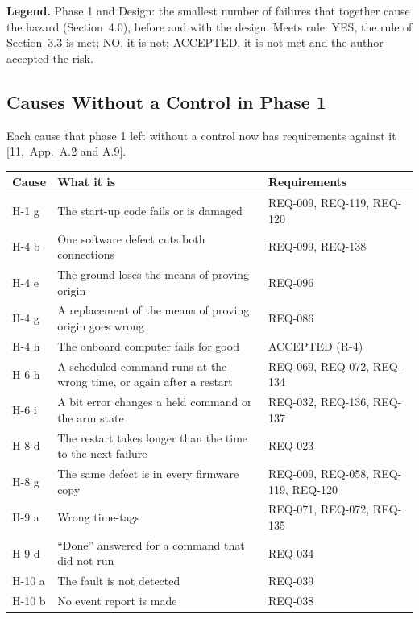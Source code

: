 \documentclass[11pt,a4paper]{article}
\begin{document}
\smallskip
\noindent\textbf{Legend.} Phase 1 and Design: the smallest number of failures
that together cause the hazard (Section~4.0), before and with the design.
Meets rule: YES, the rule of Section~3.3 is met; NO, it is not; ACCEPTED, it
is not met and the author accepted the risk.

\subsection{Causes Without a Control in Phase 1}
Each cause that phase 1 left without a control now has requirements against
it [11,~App.~A.2 and A.9].

{\small\noindent\begin{tabularx}{\textwidth}{@{}l>{\raggedright\arraybackslash}X>{\raggedright\arraybackslash}p{4.4cm}@{}}
\toprule
Cause & What it is & Requirements \\
\midrule
H-1 g & The start-up code fails or is damaged & REQ-009, REQ-119, REQ-120 \\
H-4 b & One software defect cuts both connections & REQ-099, REQ-138 \\
H-4 e & The ground loses the means of proving origin & REQ-096 \\
H-4 g & A replacement of the means of proving origin goes wrong & REQ-086 \\
H-4 h & The onboard computer fails for good & ACCEPTED (R-4) \\
H-6 h & A scheduled command runs at the wrong time, or again after a restart & REQ-069, REQ-072, REQ-134 \\
H-6 i & A bit error changes a held command or the arm state & REQ-032, REQ-136, REQ-137 \\
H-8 d & The restart takes longer than the time to the next failure & REQ-023 \\
H-8 g & The same defect is in every firmware copy & REQ-009, REQ-058, REQ-119, REQ-120 \\
H-9 a & Wrong time-tags & REQ-071, REQ-072, REQ-135 \\
H-9 d & ``Done'' answered for a command that did not run & REQ-034 \\
H-10 a & The fault is not detected & REQ-039 \\
H-10 b & No event report is made & REQ-038 \\
\bottomrule
\end{tabularx}}
\end{document}
